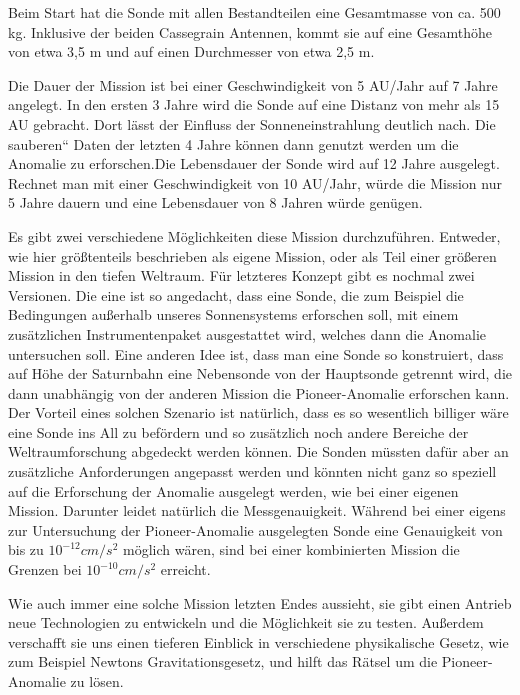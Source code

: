 Beim Start hat die Sonde mit allen Bestandteilen eine Gesamtmasse von
ca. 500 kg. Inklu\-sive der beiden Cassegrain Antennen, kommt sie auf
eine Gesamth\"ohe von etwa 3,5 m und auf einen Durchmesser von etwa 2,5
m.




Die Dauer der Mission ist bei einer Geschwindigkeit von 5 AU/Jahr auf 7
Jahre angelegt. In den ersten 3 Jahre wird die Sonde auf eine Distanz
von mehr als 15 AU gebracht. Dort l\"asst der Einfluss der
Sonneneinstrahlung deutlich nach. Die {\quotedblbase}sauberen`` Daten
der letzten 4 Jahre k\"onnen dann genutzt werden um die Anomalie zu
erforschen.Die Lebensdauer der Sonde wird
auf 12 Jahre ausgelegt. Rechnet man mit einer Ge\-schwindigkeit von 10
AU/Jahr, w\"urde die Mission nur 5 Jahre dauern und eine Lebens\-dauer
von 8 Jahren w\"urde gen\"ugen.




Es gibt zwei verschiedene M\"oglichkeiten diese Mission durchzuf\"uhren.
Entweder, wie hier gr\"o{\ss}tenteils beschrieben als eigene Mission,
oder als Teil einer gr\"o{\ss}eren Mission in den tiefen Weltraum.
F\"ur letzteres Konzept gibt es nochmal zwei Versionen. Die eine ist so
ange\-dacht, dass eine Sonde, die zum Beispiel die Bedingungen
au{\ss}erhalb unseres Sonnensys\-tems erforschen soll, mit einem
zus\"atzlichen Instrumentenpaket ausgestattet wird, welches dann die
Anomalie untersuchen soll. Eine anderen Idee ist, dass man eine Sonde
so kon\-struiert, dass auf H\"ohe der Saturnbahn eine Nebensonde von
der Hauptsonde getrennt wird, die dann unabh\"angig von der anderen
Mission die Pioneer-Anomalie erforschen kann. Der Vorteil eines solchen
Szenario ist nat\"urlich, dass es so wesentlich billiger w\"are eine
Sonde ins All zu bef\"ordern und so zus\"atzlich noch andere Bereiche
der Weltraumforschung abgedeckt werden k\"onnen. Die Sonden m\"ussten
daf\"ur aber an zus\"atzliche Anforderungen angepasst werden und
k\"onnten nicht ganz so speziell auf die Erforschung der Anomalie
ausgelegt werden, wie bei einer eigenen Mission. Darunter leidet
nat\"urlich die Messgenauigkeit. W\"ahrend bei einer eigens zur
Untersuchung der Pioneer-Anomalie ausgelegten Sonde eine Genauigkeit
von bis zu $10^{-12}\mathit{cm}/s^{2}$ m\"oglich w\"aren, sind bei
einer kombinierten Mission die Grenzen bei $10^{-10}\mathit{cm}/s^{2}$
erreicht.




Wie auch immer eine solche Mission letzten Endes aussieht, sie gibt
einen Antrieb neue Technologien zu entwickeln und die M\"oglichkeit sie
zu testen. Au{\ss}erdem verschafft sie uns einen tieferen Einblick in
verschiedene physikalische Gesetz, wie zum Beispiel Newtons
Gravitationsgesetz, und hilft das R\"atsel um die Pioneer-Anomalie zu
l\"osen.


